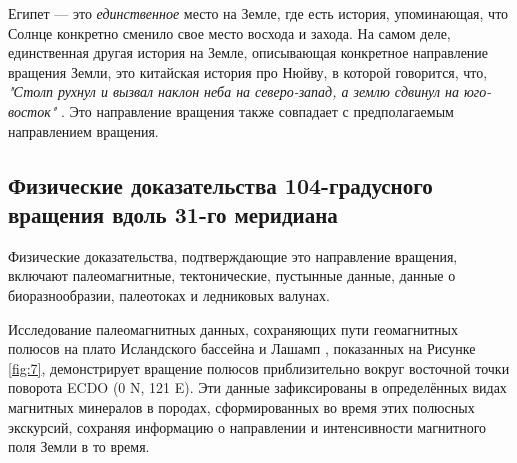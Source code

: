 \documentclass[10pt,twocolumn,letterpaper]{article}
\begin{document}
Египет — это \textit{единственное} место на Земле, где есть история, упоминающая, что Солнце конкретно сменило свое место восхода и захода. На самом деле, единственная другая история на Земле, описывающая конкретное направление вращения Земли, это китайская история про Нюйву, в которой говорится, что, \textit{"Столп рухнул и вызвал наклон неба на северо-запад, а землю сдвинул на юго-восток"} \cite{8}. Это направление вращения также совпадает с предполагаемым направлением вращения.

\subsection{Физические доказательства 104-градусного вращения вдоль 31-го меридиана}

Физические доказательства, подтверждающие это направление вращения, включают палеомагнитные, тектонические, пустынные данные, данные о биоразнообразии, палеотоках и ледниковых валунах.

Исследование палеомагнитных данных, сохраняющих пути геомагнитных полюсов на плато Исландского бассейна и Лашамп \cite{35}, показанных на Рисунке \ref{fig:7}, демонстрирует вращение полюсов приблизительно вокруг восточной точки поворота ECDO (0 N, 121 E). Эти данные зафиксированы в определённых видах магнитных минералов в породах, сформированных во время этих полюсных экскурсий, сохраняя информацию о направлении и интенсивности магнитного поля Земли в то время.
\end{document}
